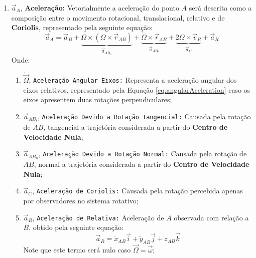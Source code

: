\documentclass{article}
\begin{document}
\begin{enumerate}[rightmargin = \leftmargin, noitemsep]
                    \item $\vec{a}_{A}$, \textbf{Aceleração:} Vetorialmente a aceleração do ponto $A$ será descrita como a composição entre o movimento rotacional, translacional, relativo e de \textbf{Coriolis}, representado pela seguinte equação:
                        \begin{equation}
                            \boxed{
                                \vec{a}_{A} = 
                                \vec{a}_{B} + 
                                \underbrace{
                                    \Omega\times(\Omega\times\vec{r}_{AB})
                                }_{\vec{a}_{AB_{n}}} + 
                                \underbrace{
                                    \dot{\Omega}\times\vec{r}_{AB}
                                }_{\vec{a}_{AB_{t}}} + 
                                \underbrace{
                                    2\Omega\times\vec{v}_{R}
                                }_{\vec{a}_{C}} + 
                                \vec{a}_{R}
                            }
                        \end{equation}
                    Onde:
                        \begin{enumerate}[rightmargin = \leftmargin]
                            \item $\dot{\vec{\Omega}}$, \texttt{Aceleração Angular Eixos:} Representa a aceleração angular dos eixos relativos, representado pela Equação \ref{eq.angularAceleration} caso os eixos apresentem duas rotações perpendiculares;

                            \item $\vec{a}_{AB_{t}}$, \texttt{Aceleração Devido a Rotação Tangencial:} Causada pela rotação de $AB$, tangencial a trajetória considerada a partir do \textbf{Centro de Velocidade Nula};

                            \item $\vec{a}_{AB_{n}}$, \texttt{Aceleração Devido a Rotação Normal:} Causada pela rotação de $AB$, normal a trajetória considerada a partir do \textbf{Centro de Velocidade Nula};

                            \item $\vec{a}_{C}$, \texttt{Aceleração de Coriolis:} Causada pela rotação percebida apenas por observadores no sistema rotativo;

                            \item $\vec{a}_{R}$, \texttt{Aceleração de Relativa:} Aceleração de $A$ observada com relação a $B$, obtido pela seguinte equação:
                                \begin{equation*}
                                    \vec{a}_{R} = 
                                    \ddot{x}_{AB}\vec{i} + 
                                    \ddot{y}_{AB}\vec{j} + 
                                    \ddot{z}_{AB}\vec{k}
                                \end{equation*}
                            Note que este termo será nulo caso $\vec{\Omega} = \vec{\omega}$;
                        \end{enumerate}
                \end{enumerate}
\end{document}

